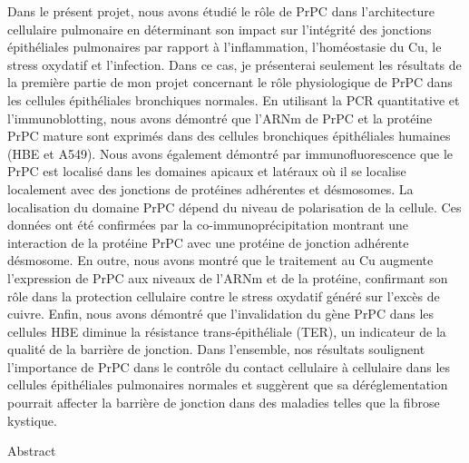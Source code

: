 Dans le présent projet, nous avons étudié le rôle de PrPC dans l'architecture cellulaire pulmonaire en déterminant son impact sur l'intégrité des jonctions épithéliales pulmonaires par rapport à l'inflammation, l'homéostasie du Cu, le stress oxydatif et l'infection. Dans ce cas, je présenterai seulement les résultats de la première partie de mon projet concernant le rôle physiologique de PrPC dans les cellules épithéliales bronchiques normales. En utilisant la PCR quantitative et l'immunoblotting, nous avons démontré que l'ARNm de PrPC et la protéine PrPC mature sont exprimés dans des cellules bronchiques épithéliales humaines (HBE et A549). Nous avons également démontré par immunofluorescence que le PrPC est localisé dans les domaines apicaux et latéraux où il se localise localement avec des jonctions de protéines adhérentes et désmosomes. La localisation du domaine PrPC dépend du niveau de polarisation de la cellule. Ces données ont été confirmées par la co-immunoprécipitation montrant une interaction de la protéine PrPC avec une protéine de jonction adhérente désmosome. En outre, nous avons montré que le traitement au Cu augmente l'expression de PrPC aux niveaux de l'ARNm et de la protéine, confirmant son rôle dans la protection cellulaire contre le stress oxydatif généré sur l'excès de cuivre. Enfin, nous avons démontré que l'invalidation du gène PrPC dans les cellules HBE diminue la résistance trans-épithéliale (TER), un indicateur de la qualité de la barrière de jonction.
Dans l'ensemble, nos résultats soulignent l'importance de PrPC dans le contrôle du contact cellulaire à cellulaire dans les cellules épithéliales pulmonaires normales et suggèrent que sa déréglementation pourrait affecter la barrière de jonction dans des maladies telles que la fibrose kystique.

\vspace*{20mm}

\renewcommand{\abstractname}{Abstract}
{\abstractname}\label{sec:abstract-diff} \\

